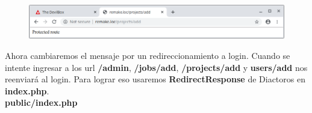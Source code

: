 \documentclass{article}
\begin{document}
\begin{figure}[h!]
  \centering
  \includegraphics[scale=0.5]{./Pictures/220_addprojects_protected.png}
\end{figure}

Ahora cambiaremos el mensaje por un redireccionamiento a login. Cuando se
intente ingresar a los url \textbf{/admin}, \textbf{/jobs/add},
\textbf{/projects/add} y \textbf{users/add} nos reenviará al login. Para lograr
eso usaremos \textbf{RedirectResponse} de Diactoros en \textbf{index.php}.\\

\textbf{public/index.php}
\end{document}
